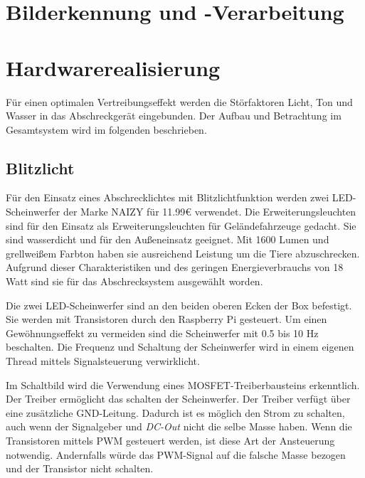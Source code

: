 

\section{Bilderkennung und -Verarbeitung}


\section{Hardwarerealisierung}

Für einen optimalen Vertreibungseffekt werden die Störfaktoren Licht, Ton und Wasser in das Abschreckgerät eingebunden. Der Aufbau und
Betrachtung im Gesamtsystem wird im folgenden beschrieben.

\subsection{Blitzlicht}

Für den Einsatz eines Abschrecklichtes mit Blitzlichtfunktion
werden zwei LED-Scheinwerfer der Marke NAIZY für 11.99€
verwendet. Die Erweiterungsleuchten sind für den Einsatz als Erweiterungsleuchten für Geländefahrzeuge gedacht. Sie sind wasserdicht und für den Außeneinsatz geeignet. Mit 1600 Lumen und grellweißem Farbton haben sie ausreichend Leistung um die Tiere abzuschrecken. Aufgrund dieser Charakteristiken und des geringen Energieverbrauchs von 18 Watt sind sie für das Abschrecksystem ausgewählt worden. \cite{am_licht}

Die zwei LED-Scheinwerfer sind an den beiden oberen Ecken der Box
befestigt. Sie werden mit Transistoren durch den Raspberry Pi gesteuert. Um einen Gewöhnungseffekt zu vermeiden sind die
Scheinwerfer mit 0.5 bis 10 Hz beschalten. Die Frequenz und Schaltung der Scheinwerfer wird in einem eigenen Thread
mittels Signalsteuerung verwirklicht.

Im Schaltbild  wird die Verwendung eines
MOSFET-Treiberbausteins erkenntlich. Der Treiber ermöglicht das
schalten der Scheinwerfer. Der Treiber verfügt über eine zusätzliche GND-Leitung. Dadurch ist es möglich den Strom zu schalten, auch wenn der Signalgeber und \textit{DC-Out} nicht die selbe Masse haben.
Wenn die Transistoren mittels PWM gesteuert werden, ist diese Art der Ansteuerung notwendig. Andernfalls würde das PWM-Signal auf die falsche Masse bezogen und der Transistor nicht schalten.

